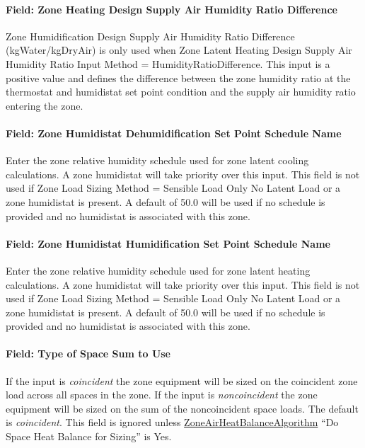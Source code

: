 \paragraph{Field: Zone Heating Design Supply Air Humidity Ratio Difference}\label{field-zone-heating-design-supply-air-humidity-ratio-difference}

Zone Humidification Design Supply Air Humidity Ratio Difference (kgWater/kgDryAir) is only used when Zone Latent Heating Design Supply Air Humidity Ratio Input
Method = HumidityRatioDifference. This input is a positive value and defines the difference between the zone humidity ratio at the thermostat and humidistat set point
condition and the supply air humidity ratio entering the zone.

\paragraph{Field: Zone Humidistat Dehumidification Set Point Schedule Name}\label{field-zone-humidistat-dehumidification-set-point-schedule-name}

Enter the zone relative humidity schedule used for zone latent cooling calculations. A zone humidistat will take priority over this input. This field is not used if Zone Load
Sizing Method = Sensible Load Only No Latent Load or a zone humidistat is present. A default of 50.0 will be used if no schedule is provided and no humidistat is
associated with this zone.

\paragraph{Field: Zone Humidistat Humidification Set Point Schedule Name}\label{field-zone-humidistat-humidification-set-point-schedule-name}

Enter the zone relative humidity schedule used for zone latent heating calculations. A zone humidistat will take priority over this input. This field is not used if Zone Load
Sizing Method = Sensible Load Only No Latent Load or a zone humidistat is present. A default of 50.0 will be used if no schedule is provided and no humidistat is
associated with this zone.

\paragraph{Field: Type of Space Sum to Use}\label{field-type-of-space-sum-to-use}

If the input is \emph{coincident} the zone equipment will be sized on the coincident zone load across all spaces in the zone. If the input is \emph{noncoincident} the zone equipment will be sized on the sum of the noncoincident space loads. The default is \emph{coincident}. This field is ignored unless \hyperref[zoneairheatbalancealgorithm]{ZoneAirHeatBalanceAlgorithm} ``Do Space Heat Balance for Sizing'' is Yes.

